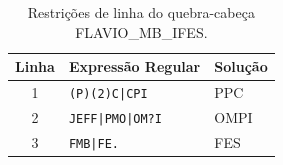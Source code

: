 \documentclass[sumario=abnt-6027-2012]{ifes8}
\newcommand{\rx}[1]{\texttt{#1}}
\begin{document}
\begin{table}[H]
  \centering
  \caption{Restrições de linha do quebra-cabeça FLAVIO\_MB\_IFES.}
  \label{tab:puzzle2-linhas}
  \begin{tabular}{clp{5cm}}
    \toprule
    \textbf{Linha} & \textbf{Expressão Regular} & \textbf{Solução} \\
    \midrule
    1 & \rx{(P)(2)C|CPI}   & PPC \\
    2 & \rx{JEFF|PMO|OM?I}  & OMPI \\
    3 & \rx{FMB|FE.}        & FES \\
    \bottomrule
  \end{tabular}
\end{table}
\end{document}
